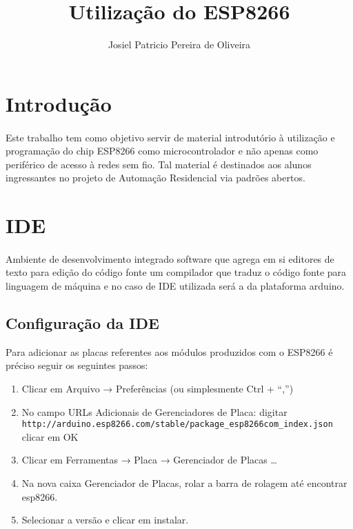 \documentclass[a4paper]{article}
\title{Utilização do ESP8266}
\author{Josiel Patricio Pereira de Oliveira}
\begin{document}
\maketitle


\section{Introdução}

\paragraph{}
Este trabalho tem como objetivo servir de material introdutório à utilização e programação do chip ESP8266 como microcontrolador e não  apenas 
como periférico de acesso à redes sem fio. Tal material é destinados aos alunos ingressantes  no projeto de Automação Residencial via padrões abertos.

\section{IDE} 

\paragraph{}
Ambiente de desenvolvimento integrado
software que agrega em si editores de texto para edição do código fonte um compilador que traduz o código fonte para linguagem de máquina e no caso de IDE utilizada será a da plataforma arduino.


\subsection{Configuração da IDE}
Para adicionar as placas referentes aos módulos produzidos com o ESP8266 é préciso seguir os seguintes passos:
\begin{enumerate}

\item Clicar em Arquivo → Preferências (ou simplesmente Ctrl + “,”)
\item No campo URLs Adicionais de Gerenciadores de Placa: digitar\\
\verb|http://arduino.esp8266.com/stable/package_esp8266com_index.json|
clicar em OK 
\item Clicar em Ferramentas → Placa → Gerenciador de Placas \dots 
\item Na nova caixa Gerenciador de Placas, rolar a barra de rolagem até encontrar esp8266.
\item Selecionar a versão e clicar em instalar.
\end{enumerate}
\end{document}
